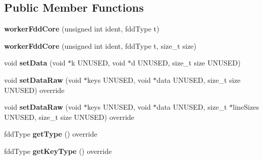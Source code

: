 \subsection*{Public Member Functions}
\begin{DoxyCompactItemize}
\item 
\hypertarget{classfaster_1_1workerFddCore_a83405d10b12b6a2c52e05ce6aa154a58}{}{\bfseries worker\+Fdd\+Core} (unsigned int ident, fdd\+Type t)\label{classfaster_1_1workerFddCore_a83405d10b12b6a2c52e05ce6aa154a58}

\item 
\hypertarget{classfaster_1_1workerFddCore_a916e1e6320f5d65f876ea8a13b8e4962}{}{\bfseries worker\+Fdd\+Core} (unsigned int ident, fdd\+Type t, size\+\_\+t size)\label{classfaster_1_1workerFddCore_a916e1e6320f5d65f876ea8a13b8e4962}

\item 
\hypertarget{classfaster_1_1workerFddCore_aadc1b6c29965af371b2c6b3f246108f6}{}void {\bfseries set\+Data} (void $\ast$k U\+N\+U\+S\+E\+D, void $\ast$d U\+N\+U\+S\+E\+D, size\+\_\+t size U\+N\+U\+S\+E\+D)\label{classfaster_1_1workerFddCore_aadc1b6c29965af371b2c6b3f246108f6}

\item 
\hypertarget{classfaster_1_1workerFddCore_ad18325128eb5c84bf1ce2c14dd885ec8}{}void {\bfseries set\+Data\+Raw} (void $\ast$keys U\+N\+U\+S\+E\+D, void $\ast$data U\+N\+U\+S\+E\+D, size\+\_\+t size U\+N\+U\+S\+E\+D) override\label{classfaster_1_1workerFddCore_ad18325128eb5c84bf1ce2c14dd885ec8}

\item 
\hypertarget{classfaster_1_1workerFddCore_ac41afe052888d211137a09702ab19ac8}{}void {\bfseries set\+Data\+Raw} (void $\ast$keys U\+N\+U\+S\+E\+D, void $\ast$data U\+N\+U\+S\+E\+D, size\+\_\+t $\ast$line\+Sizes U\+N\+U\+S\+E\+D, size\+\_\+t size U\+N\+U\+S\+E\+D) override\label{classfaster_1_1workerFddCore_ac41afe052888d211137a09702ab19ac8}

\item 
\hypertarget{classfaster_1_1workerFddCore_a485d31467701a86804469699da95cbc7}{}fdd\+Type {\bfseries get\+Type} () override\label{classfaster_1_1workerFddCore_a485d31467701a86804469699da95cbc7}

\item 
\hypertarget{classfaster_1_1workerFddCore_ae7378e2dc9398e62b2e4649ef584aad6}{}fdd\+Type {\bfseries get\+Key\+Type} () override\label{classfaster_1_1workerFddCore_ae7378e2dc9398e62b2e4649ef584aad6}


\end{DoxyCompactItemize}
